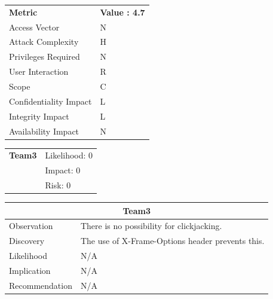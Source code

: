 \documentclass[headsepline,footsepline,footinclude=false,oneside,fontsize=11pt,paper=a4,listof=totoc,bibliography=totoc]{scrbook} %
\begin{document}
\begin{center}
	\begin{tabular}{ll}
		\rowcolor[HTML]{34CDF9}
		{\color[HTML]{ECF4FF} \textbf{Metric}}        & {\color[HTML]{ECF4FF} \textbf{Value : 4.7}} \\
		\rowcolor[HTML]{BBDAFF}
		{\color[HTML]{333333} Access Vector}          & {\color[HTML]{333333} } N              \\
		\rowcolor[HTML]{ECF4FF}
		{\color[HTML]{333333} Attack Complexity}      & {\color[HTML]{333333} } H              \\
		\rowcolor[HTML]{BBDAFF}
		{\color[HTML]{333333} Privileges Required}    & {\color[HTML]{333333} } N              \\
		\rowcolor[HTML]{ECF4FF}
		{\color[HTML]{333333} User Interaction}       & {\color[HTML]{333333} } R              \\
		\rowcolor[HTML]{BBDAFF}
		{\color[HTML]{333333} Scope}                  & {\color[HTML]{333333} } C              \\
		\rowcolor[HTML]{ECF4FF}
		{\color[HTML]{333333} Confidentiality Impact} & {\color[HTML]{333333} } L              \\
		\rowcolor[HTML]{BBDAFF}
		{\color[HTML]{333333} Integrity Impact}       & {\color[HTML]{333333} } L              \\
		\rowcolor[HTML]{ECF4FF}
		{\color[HTML]{333333} Availability Impact}    & {\color[HTML]{333333} } N
	\end{tabular}
\end{center} 
\vspace{0.5cm}

\begin{tabular}{cR{12cm}}
	\textbf{Team3} & Likelihood: 0\\& Impact: 0\\& Risk: 0
\end{tabular}

\begin{tabular}{ l|p{11cm}  }
	\hline
	\multicolumn{2}{c}{\textbf{Team3}} \\
	\hline
	Observation   & There is no possibility for clickjacking.  \\
	Discovery  &The use of X-Frame-Options header prevents this. \\
	Likelihood &  N/A \\
	Implication    & N/A \\
	Recommendation & N/A \\
	\hline
\end{tabular}

\appendix{}

\glsaddall{} %
\printglossaries{}

\printbibliography{}
\end{document}
